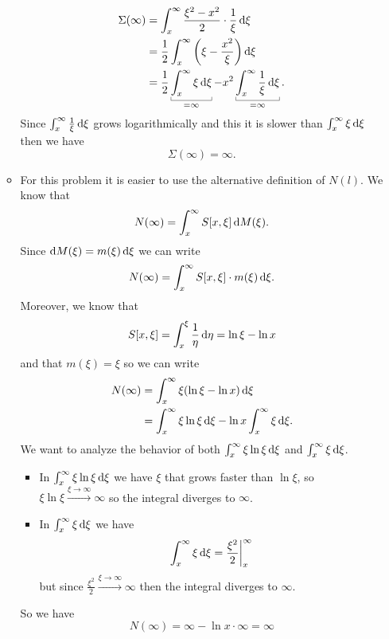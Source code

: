 \documentclass[12pt]{article}
\begin{document}
\begin{enumerate}
\begin{itemize}
\begin{align*}
				\Sigma(\infty)&=\int_{x}^{\infty}\frac{\xi^{2}-x^{2}}{2}\cdot\frac{1}{\xi}\dif\xi\\
				&=\unmezz\int_{x}^{\infty}\left(\xi-\frac{x^{2}}{\xi}\right)\dif\xi\\
				&=\unmezz\ubracketthin{\int_{x}^{\infty}\xi\dif\xi}_{=\infty}-x^{2}\ubracketthin{\int_{x}^{\infty}\frac{1}{\xi}\dif\xi}_{=\infty}.
			\end{align*}
			Since $\int_{x}^{\infty}\frac{1}{\xi}\mathop{}\!\mathrm{d}\xi$ grows logarithmically and this it is slower than $\int_{x}^{\infty}\xi\mathop{}\!\mathrm{d}\xi$ then we have
			\begin{equation*}
				\Sigma(\infty)=\infty.
			\end{equation*}
			\item For this problem it is easier to use the alternative definition of $N(l)$. We know that
			\begin{equation*}
				N(\infty)=\int_{x}^{\infty}S[x,\xi]\mathop{}\!\mathrm{d} M(\xi).
			\end{equation*}
			Since $\mathop{}\!\mathrm{d} M(\xi)=m(\xi)\mathop{}\!\mathrm{d}\xi$ we can write
			\begin{equation*}
				N(\infty)=\int_{x}^{\infty}S[x,\xi]\cdot m(\xi)\mathop{}\!\mathrm{d}\xi.
			\end{equation*}
			Moreover, we know that $$S[x,\xi]=\int_{x}^{\xi}\frac{1}{\eta}\mathop{}\!\mathrm{d}\eta=\ln\xi-\ln x$$ and that $m(\xi)=\xi$ so we can write
			\begin{align*}
				N(\infty)&=\int_{x}^{\infty}\xi(\ln\xi-\ln x)\mathop{}\!\mathrm{d}\xi\\
				&=\int_{x}^{\infty}\xi\ln\xi\mathop{}\!\mathrm{d}\xi-\ln x\int_{x}^{\infty}\xi\mathop{}\!\mathrm{d}\xi.
			\end{align*}
			We want to analyze the behavior of both $\int_{x}^{\infty}\xi\ln\xi\mathop{}\!\mathrm{d}\xi$ and $\int_{x}^{\infty}\xi\mathop{}\!\mathrm{d}\xi$.
			\begin{itemize}
				\item In $\int_{x}^{\infty}\xi\ln\xi\mathop{}\!\mathrm{d}\xi$ we have $\xi$ that grows faster than $\ln\xi$, so $\xi\ln\xi\xrightarrow{\xi\to\infty}\infty$ so the integral diverges to $\infty$.
				\item In $\int_{x}^{\infty}\xi\mathop{}\!\mathrm{d}\xi$ we have
				\begin{equation*}
					\int_{x}^{\infty}\xi\mathop{}\!\mathrm{d}\xi=\frac{\xi^{2}}{2}\bigg|_{x}^{\infty}
				\end{equation*}
				but since $\frac{\xi^{2}}{2}\xrightarrow{\xi\to\infty}\infty$ then the integral diverges to $\infty$.
			\end{itemize}
			So we have
			\begin{equation*}
				N(\infty)=\infty-\ln x\cdot\infty=\infty

\end{equation*}
\end{itemize}
\end{enumerate}
\end{document}
